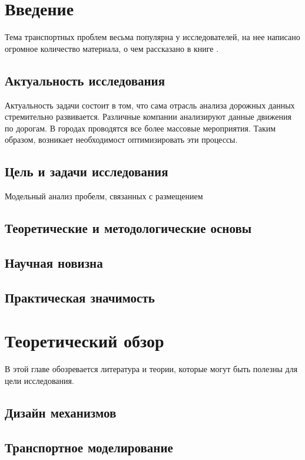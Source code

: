 \chapter{Введение}

Тема транспортных проблем весьма популярна у исследователей, на нее написано огромное количество материала, о чем рассказано в книге \cite{gas}.

\section{Актуальность исследования}

Актуальность задачи состоит в том, что сама отрасль анализа дорожных данных стремительно развивается. Различные компании анализируют данные движения по дорогам. В городах проводятся все более массовые мероприятия. Таким образом, возникает необходимост оптимизировать эти процессы.

\section{Цель и задачи исследования}
Модельный анализ пробелм, связанных с размещением

\section{Теоретические и методологические основы}
\section{Научная новизна}
\section{Практическая значимость}


\chapter{Теоретический обзор}

В этой главе обозревается литература и теории, которые могут быть полезны для цели исследования.

\section{Дизайн механизмов}


\section{Транспортное моделирование}
